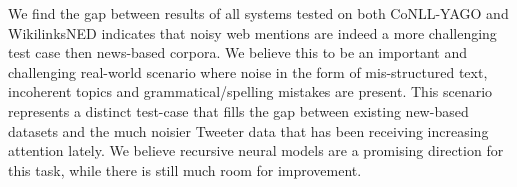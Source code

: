 \documentclass[11pt]{article}
\begin{document}
	We find the gap between results of all systems tested on both CoNLL-YAGO and WikilinksNED indicates that noisy web mentions are indeed a more challenging test case then news-based corpora. We believe this to be an important and challenging real-world scenario where noise in the form of mis-structured text, incoherent topics and grammatical/spelling mistakes are present. This scenario represents a distinct test-case that fills the gap between existing new-based datasets and the much noisier Tweeter data that has been receiving increasing attention lately. We believe recursive neural models are a promising direction for this task, while there is still much room for improvement. 
	
	
	
	
\end{document}
